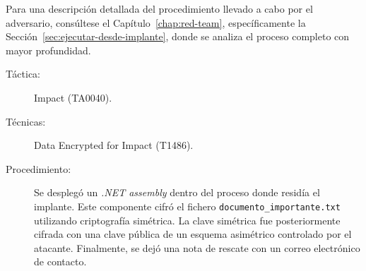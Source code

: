 Para una descripción detallada del procedimiento llevado a cabo por el adversario, consúltese el Capítulo~\ref{chap:red-team}, específicamente la Sección~\ref{sec:ejecutar-desde-implante}, donde se analiza el proceso completo con mayor profundidad.
\begin{leftbar}
    \begin{description}
        \item[Táctica:] Impact (TA0040).
        \item[Técnicas:] Data Encrypted for Impact (T1486).
        \item[Procedimiento:] Se desplegó un \textit{.NET assembly} dentro del proceso donde residía el implante. Este componente cifró el fichero \texttt{documento\_importante.txt} utilizando criptografía simétrica. La clave simétrica fue posteriormente cifrada con una clave pública de un esquema asimétrico controlado por el atacante. Finalmente, se dejó una nota de rescate con un correo electrónico de contacto.
    \end{description}
\end{leftbar}

